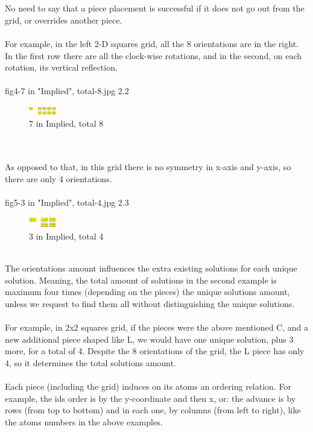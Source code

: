 \documentclass[a4paper,twoside,10pt]{report}
\begin{document}
\\
\\
No need to say that a piece placement is successful if it does not go out from the grid, or overrides another piece.
\\
\\
For example, in the left 2-D squares grid, all the 8 orientations are in the right. In the first row there are all the clock-wise rotations, and in the second, on each rotation, its vertical reflection.
\\
\\
fig4-7 in "Implied", total-8.jpg 2.2
\\
\begin{figure}[p]
	\includegraphics[width=12mm]{fig4-7_in_implied,_total-_8.jpg}
	\caption{7 in Implied, total 8}
	\label{fig:7 in Implied, total 8}
\end{figure}

\\
\\As opposed to that, in this grid there is no symmetry in x-axis and y-axis, so there are only 4 orientations.
\\
\\
fig5-3 in "Implied", total-4.jpg 2.3
\\
\begin{figure}[p]
	\includegraphics[width=12mm]{fig5-3_in_implied,_total-_4.jpg}
	\caption{3 in Implied, total 4}
	\label{fig:3 in Implied, total 4}
\end{figure}

\\
The orientations amount influences the extra existing solutions for each unique solution. Meaning, the total amount of solutions in the second example is maximum four times (depending on the pieces) the unique solutions amount, unless we request to find them all without distinguishing the unique solutions.
\\
\\
For example, in 2x2 squares grid, if the pieces were the above mentioned C, and a new additional piece shaped like L, we would have one unique solution, plus 3 more, for a total of 4. Despite the 8 orientations of the grid, the L piece has only 4, so it determines the total solutions amount.
\\
\\
Each piece (including the grid) induces on its atoms an ordering relation. For example, the ids order is by the y-coordinate and then x, or: the advance is by rows (from top to bottom) and in each one, by columns (from left to right), like the atoms numbers in the above examples.
\end{document}
